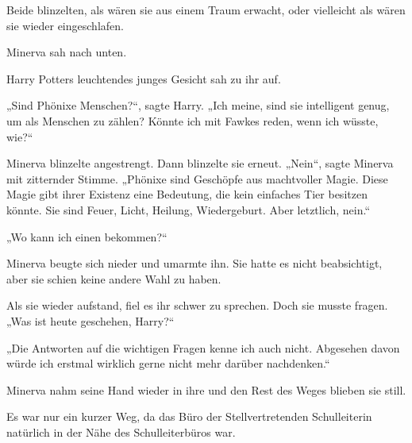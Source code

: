 Beide blinzelten, als wären sie aus einem Traum erwacht, oder vielleicht als wären sie wieder eingeschlafen.

Minerva sah nach unten.

Harry Potters leuchtendes junges Gesicht sah zu ihr auf.

„Sind Phönixe Menschen?“, sagte Harry. „Ich meine, sind sie intelligent genug, um als Menschen zu zählen? Könnte ich mit Fawkes reden, wenn ich wüsste, wie?“

Minerva blinzelte angestrengt. Dann blinzelte sie erneut. „Nein“, sagte Minerva mit zitternder Stimme. „Phönixe sind Geschöpfe aus machtvoller Magie. Diese Magie gibt ihrer Existenz eine Bedeutung, die kein einfaches Tier besitzen könnte. Sie sind Feuer, Licht, Heilung, Wiedergeburt. Aber letztlich, nein.“

„Wo kann ich einen bekommen?“

Minerva beugte sich nieder und umarmte ihn. Sie hatte es nicht beabsichtigt, aber sie schien keine andere Wahl zu haben.

Als sie wieder aufstand, fiel es ihr schwer zu sprechen. Doch sie musste fragen. „Was ist heute geschehen, Harry?“

„Die Antworten auf die wichtigen Fragen kenne ich auch nicht. Abgesehen davon würde ich erstmal wirklich gerne nicht mehr darüber nachdenken.“

Minerva nahm seine Hand wieder in ihre und den Rest des Weges blieben sie still.

Es war nur ein kurzer Weg, da das Büro der Stellvertretenden Schulleiterin natürlich in der Nähe des Schulleiterbüros war.

